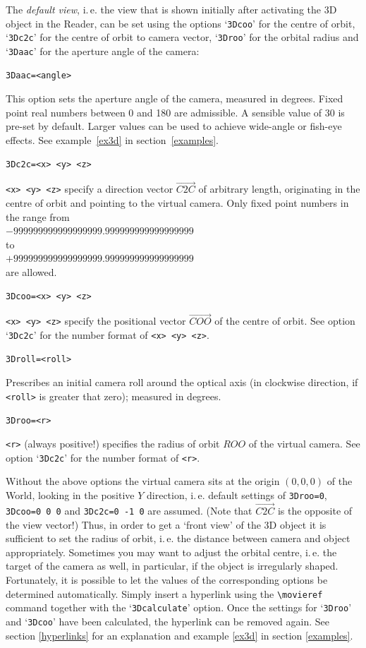 \documentclass[a4paper]{article}
\begin{document}
The \emph{default view}, i.\,e. the view that is shown initially after activating the 3D object in the Reader, can be set using the options `\verb+3Dcoo+' for the centre of orbit, `\verb+3Dc2c+' for the centre of orbit to camera vector, `\verb+3Droo+' for the orbital radius and `\verb+3Daac+' for the aperture angle of the camera:
\begin{verbatim}
3Daac=<angle>
\end{verbatim}
This option sets the aperture angle of the camera, measured in degrees. Fixed point real numbers between 0 and 180 are admissible. A sensible value of 30 is pre-set by default. Larger values can be used to achieve wide-angle or fish-eye effects. See example~\ref{ex3d} in section~\ref{examples}.
\begin{verbatim}
3Dc2c=<x> <y> <z>
\end{verbatim}
\verb+<x> <y> <z>+ specify a direction vector $\overrightarrow{C2C}$ of arbitrary length, originating in the centre of orbit and pointing to the virtual camera. Only fixed point numbers in the range from\\[1ex]
\phantom{xxxx}$-999999999999999999.999999999999999999$\\
to\\
\phantom{xxxx}$+999999999999999999.999999999999999999$\\[1ex]
are allowed.
\begin{verbatim}
3Dcoo=<x> <y> <z>
\end{verbatim}
\verb+<x> <y> <z>+ specify the positional vector $\overrightarrow{COO}$ of the centre of orbit. See option `\verb+3Dc2c+' for the number format of \verb+<x> <y> <z>+.
\begin{verbatim}
3Droll=<roll>
\end{verbatim}
Prescribes an initial camera roll around the optical axis (in clockwise direction, if \verb+<roll>+ is greater that zero); measured in degrees.
\begin{verbatim}
3Droo=<r>
\end{verbatim}
\verb+<r>+ (always positive!) specifies the radius of orbit $ROO$ of the virtual camera. See option `\verb+3Dc2c+' for the number format of \verb+<r>+.

Without the above options the virtual camera sits at the origin $(0,0,0)$ of the World, looking in the positive $Y$ direction, i.\,e. default settings of \verb+3Droo=0+, \verb+3Dcoo=0 0 0+ and  \verb+3Dc2c=0 -1 0+ are assumed. (Note that $\overrightarrow{C2C}$ is the opposite of the view vector!) Thus, in order to get a `front view' of the 3D object it is sufficient to set the radius of orbit, i.\,e. the distance between camera and object appropriately. Sometimes you may want to adjust the orbital centre, i.\,e. the target of the camera as well, in particular, if the object is irregularly shaped. Fortunately, it is possible to let the values of the corresponding options be determined automatically. Simply insert a hyperlink using the \verb+\movieref+ command together with the `\verb+3Dcalculate+' option. Once the settings for `\verb+3Droo+' and `\verb+3Dcoo+' have been calculated, the hyperlink can be removed again. See section \ref{hyperlinks} for an explanation and example \ref{ex3d} in section \ref{examples}.
\end{document}
